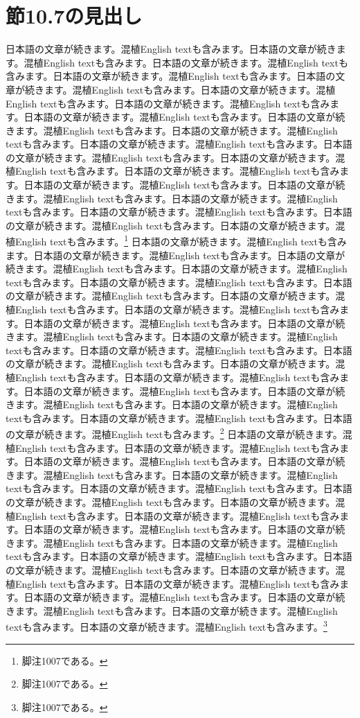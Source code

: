 \documentclass[pdflatex,book]{jlreq}
\begin{document}
\section{節10.7の見出し}
日本語の文章が続きます。混植English textも含みます。日本語の文章が続きます。混植English textも含みます。日本語の文章が続きます。混植English textも含みます。日本語の文章が続きます。混植English textも含みます。日本語の文章が続きます。混植English textも含みます。日本語の文章が続きます。混植English textも含みます。日本語の文章が続きます。混植English textも含みます。日本語の文章が続きます。混植English textも含みます。日本語の文章が続きます。混植English textも含みます。日本語の文章が続きます。混植English textも含みます。日本語の文章が続きます。混植English textも含みます。日本語の文章が続きます。混植English textも含みます。日本語の文章が続きます。混植English textも含みます。日本語の文章が続きます。混植English textも含みます。日本語の文章が続きます。混植English textも含みます。日本語の文章が続きます。混植English textも含みます。日本語の文章が続きます。混植English textも含みます。日本語の文章が続きます。混植English textも含みます。日本語の文章が続きます。混植English textも含みます。日本語の文章が続きます。混植English textも含みます。\footnote{脚注1007である。}
日本語の文章が続きます。混植English textも含みます。日本語の文章が続きます。混植English textも含みます。日本語の文章が続きます。混植English textも含みます。日本語の文章が続きます。混植English textも含みます。日本語の文章が続きます。混植English textも含みます。日本語の文章が続きます。混植English textも含みます。日本語の文章が続きます。混植English textも含みます。日本語の文章が続きます。混植English textも含みます。日本語の文章が続きます。混植English textも含みます。日本語の文章が続きます。混植English textも含みます。日本語の文章が続きます。混植English textも含みます。日本語の文章が続きます。混植English textも含みます。日本語の文章が続きます。混植English textも含みます。日本語の文章が続きます。混植English textも含みます。日本語の文章が続きます。混植English textも含みます。日本語の文章が続きます。混植English textも含みます。日本語の文章が続きます。混植English textも含みます。日本語の文章が続きます。混植English textも含みます。日本語の文章が続きます。混植English textも含みます。日本語の文章が続きます。混植English textも含みます。\footnote{脚注1007である。}
日本語の文章が続きます。混植English textも含みます。日本語の文章が続きます。混植English textも含みます。日本語の文章が続きます。混植English textも含みます。日本語の文章が続きます。混植English textも含みます。日本語の文章が続きます。混植English textも含みます。日本語の文章が続きます。混植English textも含みます。日本語の文章が続きます。混植English textも含みます。日本語の文章が続きます。混植English textも含みます。日本語の文章が続きます。混植English textも含みます。日本語の文章が続きます。混植English textも含みます。日本語の文章が続きます。混植English textも含みます。日本語の文章が続きます。混植English textも含みます。日本語の文章が続きます。混植English textも含みます。日本語の文章が続きます。混植English textも含みます。日本語の文章が続きます。混植English textも含みます。日本語の文章が続きます。混植English textも含みます。日本語の文章が続きます。混植English textも含みます。日本語の文章が続きます。混植English textも含みます。日本語の文章が続きます。混植English textも含みます。日本語の文章が続きます。混植English textも含みます。\footnote{脚注1007である。}
\end{document}
